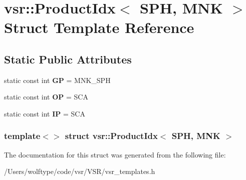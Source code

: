 \hypertarget{structvsr_1_1_product_idx_3_01_s_p_h_00_01_m_n_k_01_4}{\section{vsr\-:\-:Product\-Idx$<$ S\-P\-H, M\-N\-K $>$ Struct Template Reference}
\label{structvsr_1_1_product_idx_3_01_s_p_h_00_01_m_n_k_01_4}
}
\subsection*{Static Public Attributes}
\begin{DoxyCompactItemize}
\item 
\hypertarget{structvsr_1_1_product_idx_3_01_s_p_h_00_01_m_n_k_01_4_a54195b6c7b897996a1ca5d6f7d8e4187}{static const int {\bfseries G\-P} = M\-N\-K\-\_\-\-S\-P\-H}\label{structvsr_1_1_product_idx_3_01_s_p_h_00_01_m_n_k_01_4_a54195b6c7b897996a1ca5d6f7d8e4187}

\item 
\hypertarget{structvsr_1_1_product_idx_3_01_s_p_h_00_01_m_n_k_01_4_a5816dec8edd87fcca02cd9f236e86588}{static const int {\bfseries O\-P} = S\-C\-A}\label{structvsr_1_1_product_idx_3_01_s_p_h_00_01_m_n_k_01_4_a5816dec8edd87fcca02cd9f236e86588}

\item 
\hypertarget{structvsr_1_1_product_idx_3_01_s_p_h_00_01_m_n_k_01_4_ad061ae6b7dcca5e8cc9a90c44fca5798}{static const int {\bfseries I\-P} = S\-C\-A}\label{structvsr_1_1_product_idx_3_01_s_p_h_00_01_m_n_k_01_4_ad061ae6b7dcca5e8cc9a90c44fca5798}

\end{DoxyCompactItemize}
\subsubsection*{template$<$$>$ struct vsr\-::\-Product\-Idx$<$ S\-P\-H, M\-N\-K $>$}



The documentation for this struct was generated from the following file\-:\begin{DoxyCompactItemize}
\item 
/\-Users/wolftype/code/vsr/\-V\-S\-R/vsr\-\_\-templates.\-h\end{DoxyCompactItemize}
